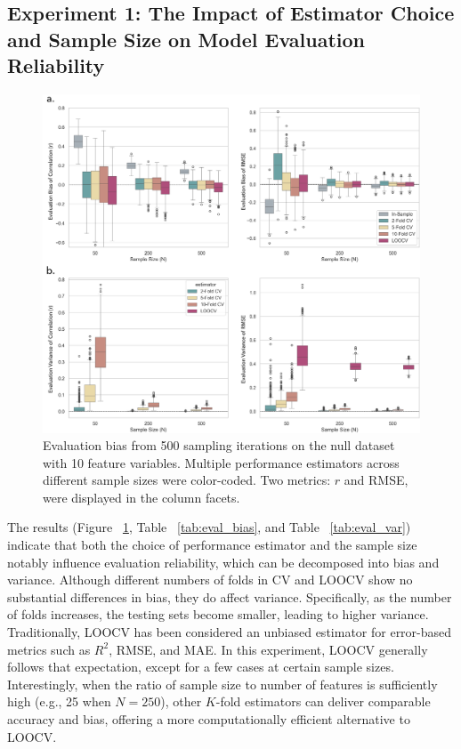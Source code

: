 \subsection{Experiment 1: The Impact of Estimator Choice and Sample Size on Model Evaluation Reliability}

\begin{figure}[H]
    \centering
    \includegraphics[width=.8\textwidth]{fig_6.jpg}
    \caption{Evaluation bias from 500 sampling iterations on the null dataset with 10 feature variables. Multiple performance estimators across different sample sizes were color-coded. Two metrics: $r$ and RMSE, were displayed in the column facets.}
    \label{fig:s1_biasvar}
\end{figure}


The results (Figure ~\ref{fig:s1_biasvar}, Table ~\ref{tab:eval_bias}, and Table ~\ref{tab:eval_var}) indicate that both the choice of performance estimator and the sample size notably influence evaluation reliability, which can be decomposed into bias and variance. Although different numbers of folds in CV and LOOCV show no substantial differences in bias, they do affect variance. Specifically, as the number of folds increases, the testing sets become smaller, leading to higher variance. Traditionally, LOOCV has been considered an unbiased estimator for error-based metrics such as $R^2$, RMSE, and MAE. In this experiment, LOOCV generally follows that expectation, except for a few cases at certain sample sizes. Interestingly, when the ratio of sample size to number of features is sufficiently high (e.g., 25 when $N=250$), other $K$-fold estimators can deliver comparable accuracy and bias, offering a more computationally efficient alternative to LOOCV.

